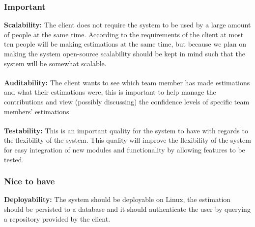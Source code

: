 \subsubsection{Important}
	{\bfseries Scalability:}
	The client does not require the system to be used by a large amount of people at the same time. According to the requirements of the client at most ten people will be making estimations at the same time, but because we plan on making the system open-source scalability should be kept in mind such that the system will be somewhat scalable.
	\\ \\
	{\bfseries Auditability:}
	The client wants to see which team member has made estimations and what their estimations were, this is important to help manage the contributions and view (possibly discussing) the confidence levels of specific team members' estimations.
	\\ \\
	{\bfseries Testability:}
	This is an important quality for the system to have with regards to the flexibility of the system. This quality will improve the flexibility of the system for easy integration of new modules and functionality by allowing features to be tested.
\subsubsection{Nice to have}
	{\bfseries Deployability:} The system should be deployable on Linux, the estimation should be persisted to a database and it should authenticate the user by querying a repository provided by the client.